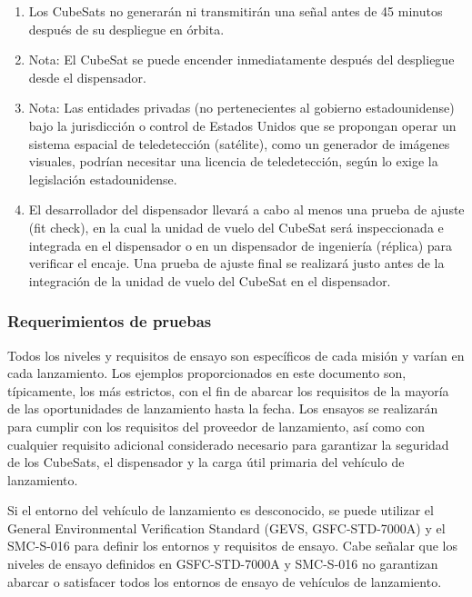 \documentclass[12pt]{article}
\begin{document}
\begin{enumerate}
		\item Los CubeSats no generarán ni transmitirán una señal antes de 45 minutos después de su despliegue en órbita.
		
		\item Nota: El CubeSat se puede encender inmediatamente después del despliegue desde el dispensador.
		
		\item Nota: Las entidades privadas (no pertenecientes al gobierno estadounidense) bajo la jurisdicción o control de Estados Unidos que se propongan operar un sistema espacial de teledetección (satélite), como un generador de imágenes visuales, podrían necesitar una licencia de teledetección, según lo exige la legislación estadounidense.
		
		\item El desarrollador del dispensador llevará a cabo al menos una prueba de ajuste (fit check), en la cual la unidad de vuelo del CubeSat será inspeccionada e integrada en el dispensador o en un dispensador de ingeniería (réplica) para verificar el encaje. Una prueba de ajuste final se realizará justo antes de la integración de la unidad de vuelo del CubeSat en el dispensador.
	\end{enumerate}
	
	\subsubsection{Requerimientos de pruebas}
	Todos los niveles y requisitos de ensayo son específicos de cada misión y varían en cada lanzamiento. Los ejemplos proporcionados en este documento son, típicamente, los más estrictos, con el fin de abarcar los requisitos de la mayoría de las oportunidades de lanzamiento hasta la fecha. Los ensayos se realizarán para cumplir con los requisitos del proveedor de lanzamiento, así como con cualquier requisito adicional considerado necesario para garantizar la seguridad de los CubeSats, el dispensador y la carga útil primaria del vehículo de lanzamiento.
	
	Si el entorno del vehículo de lanzamiento es desconocido, se puede utilizar el General Environmental Verification Standard (GEVS, GSFC-STD-7000A) \cite{GSFC7000A2013} y el SMC-S-016 \cite{SMCS016_2014} para definir los entornos y requisitos de ensayo. Cabe señalar que los niveles de ensayo definidos en GSFC-STD-7000A y SMC-S-016 no garantizan abarcar o satisfacer todos los entornos de ensayo de vehículos de lanzamiento.
	
\end{document}
